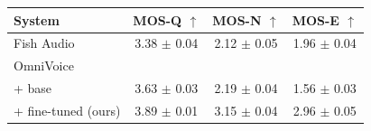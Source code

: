 \small
\begin{tabular}{lccc}
\toprule
System & \textbf{MOS-Q} $\uparrow$ & \textbf{MOS-N} $\uparrow$ & \textbf{MOS-E} $\uparrow$ \\
\midrule
Fish Audio                   & 3.38 $\pm$ 0.04 & 2.12 $\pm$ 0.05 & 1.96 $\pm$ 0.04 \\
OmniVoice                   & & & \\
\quad + base                 & 3.63 $\pm$ 0.03 & 2.19 $\pm$ 0.04 & 1.56 $\pm$ 0.03 \\
\quad + fine-tuned (ours)    & 3.89 $\pm$ 0.01 & 3.15 $\pm$ 0.04 & 2.96 $\pm$ 0.05 \\
\bottomrule
\end{tabular}
